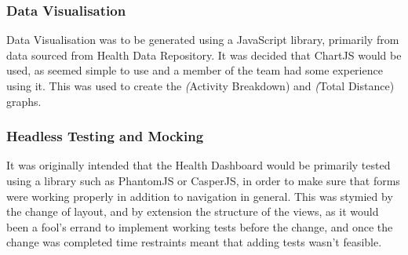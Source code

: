 \subsubsection{Data Visualisation}
\par
Data Visualisation was to be generated using a JavaScript library, primarily from data sourced from Health Data Repository. It was decided that ChartJS would be used, as seemed simple to use and a member of the team had some experience using it. This was used to create the \textit(Activity Breakdown) and \textit(Total Distance) graphs.

\subsubsection{Headless Testing and Mocking}
\par
It was originally intended that the Health Dashboard would be primarily tested using a library such as PhantomJS or CasperJS, in order to make sure that forms were working properly in addition to navigation in general. This was stymied by the change of layout, and by extension the structure of the views, as it would been a fool's errand to implement working tests before the change, and once the change was completed time restraints meant that adding tests wasn't feasible.
